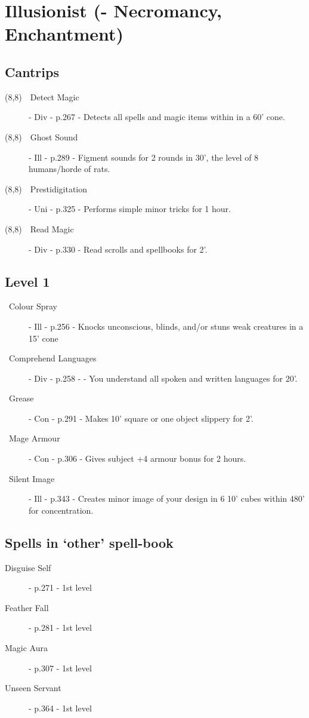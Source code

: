 \documentclass[10pt,a4paper,oneside]{article}
\begin{document}
\newcommand{\smallbox}{\framebox(8,8){}}
\newcommand{\boxitem}[3]{\item[\smallbox~~#1] - #2 - p.#3 - }
\newcommand{\nboxitem}[4]{\item[\Repeat{#1}{\smallbox~}~#2] - #3 - p.#4 - }

\section*{Illusionist (- Necromancy, Enchantment)}

\subsection*{Cantrips}

\begin{description}
  \boxitem{Detect Magic}{Div}{267} Detects all spells and magic items within in a 60' cone. 
  \boxitem{Ghost Sound}{Ill}{289} Figment sounds for 2 rounds in 30', the level of 8 humans/horde of rats.
  \boxitem{Prestidigitation}{Uni}{325} Performs simple minor tricks for 1 hour.
  \boxitem{Read Magic}{Div}{330} Read scrolls and spellbooks for 2'.
\end{description}

\subsection*{Level 1}

\begin{description}
  \nboxitem{4}{Colour Spray}{Ill}{256} Knocks unconscious, blinds, and/or stuns weak creatures in a 15' cone
  \nboxitem{3}{Comprehend Languages}{Div}{258} - You understand all spoken and written languages for 20'.
  \nboxitem{3}{Grease}{Con}{291} Makes 10' square or one object slippery for 2'.
  \nboxitem{3}{Mage Armour}{Con}{306} Gives subject +4 armour bonus for 2 hours.
  \nboxitem{4}{Silent Image}{Ill}{343} Creates minor image of your design in 6 10' cubes within 480' for concentration.
\end{description}

\subsection*{Spells in `other' spell-book}

\begin{description}
  \item[Disguise Self] - p.271 - 1st level
  \item[Feather Fall] - p.281 - 1st level
  \item[Magic Aura] - p.307 - 1st level
  \item[Unseen Servant] - p.364 - 1st level
\end{description}
\end{document}
